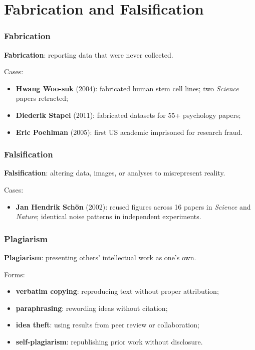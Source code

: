 \documentclass[]{beamer}
\begin{document}
\section{Fabrication and Falsification}

\begin{frame}[fragile]
\frametitle{Fabrication}
\textbf{Fabrication}: reporting data that were never collected.

Cases:
\begin{itemize}
  \item \textbf{Hwang Woo-suk} (2004): fabricated human stem cell lines; two \textit{Science} papers retracted;
  \item \textbf{Diederik Stapel} (2011): fabricated datasets for 55+ psychology papers;
  \item \textbf{Eric Poehlman} (2005): first US academic imprisoned for research fraud.
\end{itemize}

\end{frame}

\begin{frame}[fragile]
\frametitle{Falsification}
\textbf{Falsification}: altering data, images, or analyses to misrepresent reality.

Cases:
\begin{itemize}
  \item \textbf{Jan Hendrik Schön} (2002): reused figures across 16 papers in \textit{Science} and \textit{Nature}; identical noise patterns in independent experiments.
\end{itemize}

\end{frame}

\begin{frame}[fragile]
\frametitle{Plagiarism}
\textbf{Plagiarism}: presenting others' intellectual work as one's own.

Forms:
\begin{itemize}
  \item \textbf{verbatim copying}: reproducing text without proper attribution;
  \item \textbf{paraphrasing}: rewording ideas without citation;
  \item \textbf{idea theft}: using results from peer review or collaboration;
  \item \textbf{self-plagiarism}: republishing prior work without disclosure.
\end{itemize}

\end{frame}
\end{document}
